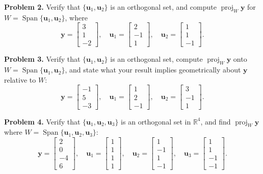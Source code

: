 \documentclass[11pt, letterpaper]{article}
\theoremstyle{definition}
\theoremstyle{remark}
\newcommand{\R}{\mathbb{R}}
\begin{document}
\textbf{Problem 2.} Verify that $\{\mathbf{u}_1, \mathbf{u}_2\}$ is an orthogonal set, and compute $\operatorname{proj}_W \mathbf{y}$ for $W = \operatorname{Span}\{\mathbf{u}_1, \mathbf{u}_2\}$, where
\[
\mathbf{y} = \begin{bmatrix} 3 \\ 1 \\ -2 \end{bmatrix}, \quad \mathbf{u}_1 = \begin{bmatrix} 2 \\ -1 \\ 1 \end{bmatrix}, \quad \mathbf{u}_2 = \begin{bmatrix} 1 \\ 1 \\ -1 \end{bmatrix}.
\]

\textbf{Problem 3.} Verify that $\{\mathbf{u}_1, \mathbf{u}_2\}$ is an orthogonal set, compute $\operatorname{proj}_W \mathbf{y}$ onto $W = \operatorname{Span}\{\mathbf{u}_1, \mathbf{u}_2\}$, and state what your result implies geometrically about $\mathbf{y}$ relative to $W$:
\[
\mathbf{y} = \begin{bmatrix} -1 \\ 5 \\ -3 \end{bmatrix}, \quad \mathbf{u}_1 = \begin{bmatrix} 1 \\ 2 \\ -1 \end{bmatrix}, \quad \mathbf{u}_2 = \begin{bmatrix} 3 \\ -1 \\ 1 \end{bmatrix}.
\]

\textbf{Problem 4.} Verify that $\{\mathbf{u}_1, \mathbf{u}_2, \mathbf{u}_3\}$ is an orthogonal set in $\R^4$, and find $\operatorname{proj}_W \mathbf{y}$ where $W = \operatorname{Span}\{\mathbf{u}_1, \mathbf{u}_2, \mathbf{u}_3\}$:
\[
\mathbf{y} = \begin{bmatrix} 2 \\ 0 \\ -4 \\ 6 \end{bmatrix}, \quad \mathbf{u}_1 = \begin{bmatrix} 1 \\ 1 \\ 1 \\ 1 \end{bmatrix}, \quad \mathbf{u}_2 = \begin{bmatrix} 1 \\ -1 \\ 1 \\ -1 \end{bmatrix}, \quad \mathbf{u}_3 = \begin{bmatrix} 1 \\ 1 \\ -1 \\ -1 \end{bmatrix}.
\]
\end{document}

